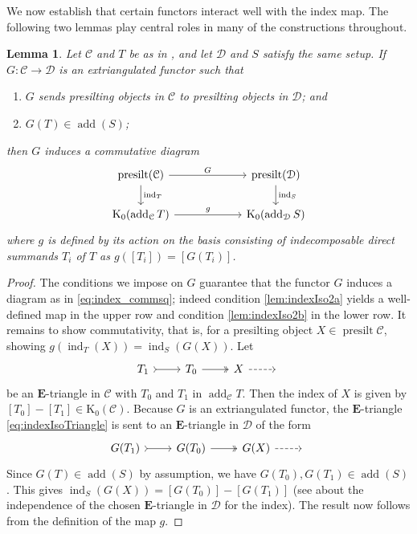 \documentclass[10pt,twoside, a4paper,reqno]{amsart}
\DeclareMathOperator{\presilt}{presilt}
\DeclareMathOperator{\add}{add}
\DeclareMathOperator{\ind}{ind}
\newcommand{\calC}{\mathcal{C}}
\newcommand{\calD}{\mathcal{D}}
\newcommand{\E}{\mathbf{E}}
\newcommand{\K}{\mathrm{K}}
\newtheorem{lemma}[theorem]{Lemma}
\theoremstyle{definition}
\begin{document}
We now establish that certain functors interact well with the index map. The following two lemmas play central roles in many of the constructions throughout.
\begin{lemma} \label{lem:indexFanIso2} Let $\calC$ and $T$ be as in , and let $\calD$ and $S$ satisfy the same setup. If $G: \calC \to \calD$ is an extriangulated functor such that
    \begin{enumerate}
        \item\label{lem:indexIso2a} $G$ sends presilting objects in $\calC$ to presilting objects in $\calD$; and
        \item\label{lem:indexIso2b} $G(T) \in \add(S)$;
    \end{enumerate}
    then $G$ induces a commutative diagram 
     \begin{equation}\label{eq:index_commsq}
    \begin{tikzcd}[column sep=6em]
        \presilt({\calC}) \arrow[d,"\ind_T "] \arrow[r, "G"] & \presilt({\calD}) \arrow[d,"\ind_S"] \\
        \K_0(\add_{\calC}T) \arrow[r,"g"] & \K_0(\add_{\calD}S)
    \end{tikzcd}
    \end{equation}
    where $g$ is defined by its action on the basis consisting of indecomposable direct summands $T_i$ of $T$ as $g([T_i]) = [G(T_i)]$. 
\end{lemma}
\begin{proof}
The conditions we impose on $G$ guarantee that the functor $G$ induces a diagram as in \eqref{eq:index_commsq}; indeed condition \eqref{lem:indexIso2a} yields a well-defined map in the upper row and condition \eqref{lem:indexIso2b} in the lower row.
    It remains to show commutativity, that is, for a presilting object $X \in \presilt \calC$,
    showing $g(\ind_T(X)) = \ind_S(G(X))$. Let 
    \begin{equation}\label{eq:indexIsoTriangle} \begin{tikzcd}
            T_1 \arrow[r, tail] & T_0 \arrow[r,two heads] & X \arrow[r, dashed] & {}
        \end{tikzcd} \end{equation}
        be an $\E$-triangle in $\calC$ with $T_0$ and $T_1$ in $\add_{\calC} T$. Then the index of $X$ is given by $[T_0]- [T_1] \in \K_0(\calC)$. Because $G$ is an extriangulated functor, {the} $\E$-triangle {\cref{eq:indexIsoTriangle}} is sent to an $\E$-triangle in $\calD$ of the form
        \[ \begin{tikzcd}
            G(T_1) \arrow[r, tail] & G(T_0) \arrow[r,two heads] & G(X) \arrow[r, dashed] & {}
        \end{tikzcd}\]
        Since $G(T) \in \add(S)$ by assumption, 
        we have $G(T_0), G(T_1) \in \add(S)$.
        This gives $\ind_S(G(X)) = [G(T_0)]-[G(T_1)]$ (see \cite[§4.3]{GNP23} about the independence of the chosen $\E$-triangle in $\calD$ for the index). The result now follows from the definition of the map $g$.
        \end{proof}
        
\end{document}
